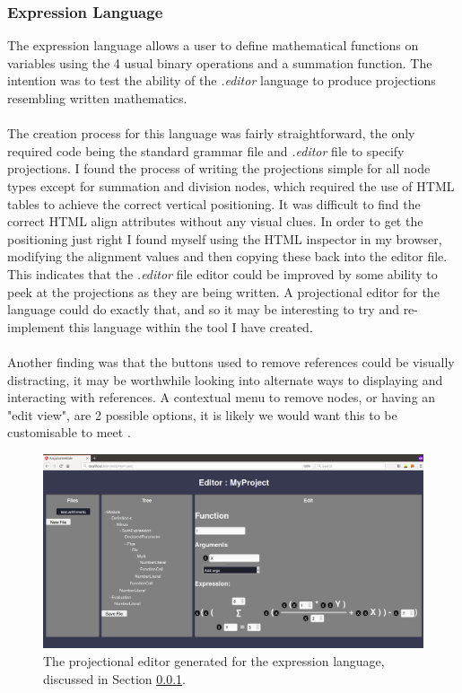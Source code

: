 \documentclass{article}
\begin{document}
{\subsubsection{Expression Language}\label{expressionLang}
The expression language allows a user to define mathematical functions on variables using the 4 usual binary operations and a summation function. The intention was to test the ability of the \emph{.editor} language to produce projections resembling written mathematics.
\\
\\
The creation process for this language was fairly straightforward, the only required code being the standard grammar file and \emph{.editor} file to specify projections. I found the process of writing the projections simple for all node types except for summation and division nodes, which required the use of HTML tables to achieve the correct vertical positioning. It was difficult to find the correct HTML align attributes without any visual clues. In order to get the positioning just right I found myself using the HTML inspector in my browser, modifying the alignment values and then copying these back into the editor file. This indicates that the \emph{.editor} file editor could be improved by some ability to peek at the projections as they are being written. A projectional editor for the language could do exactly that, and so it may be interesting to try and re-implement this language within the tool I have created.   
\\
\\
Another finding was that the buttons used to remove references could be visually distracting, it may be worthwhile looking into alternate ways to displaying and interacting with references. A contextual menu to remove nodes, or having an "edit view", are 2 possible options, it is likely we would want this to be customisable to meet \RCustom.
\begin{figure}[h!]
  \centering
  \includegraphics[width=\linewidth]{./Screenshots/arithmeticUI3.png}
  \caption{The projectional editor generated for the expression language, discussed in Section \ref{expressionLang}.}
  \label{fig:arithmeticUI}
\end{figure}


}
\end{document}
